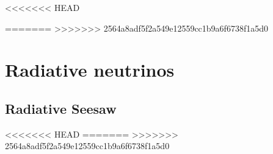 <<<<<<< HEAD

=======
>>>>>>> 2564a8adf5f2a549e12559cc1b9a6f6738f1a5d0
\chapter{Radiative neutrinos}

\section{Radiative Seesaw}








<<<<<<< HEAD
=======
>>>>>>> 2564a8adf5f2a549e12559cc1b9a6f6738f1a5d0